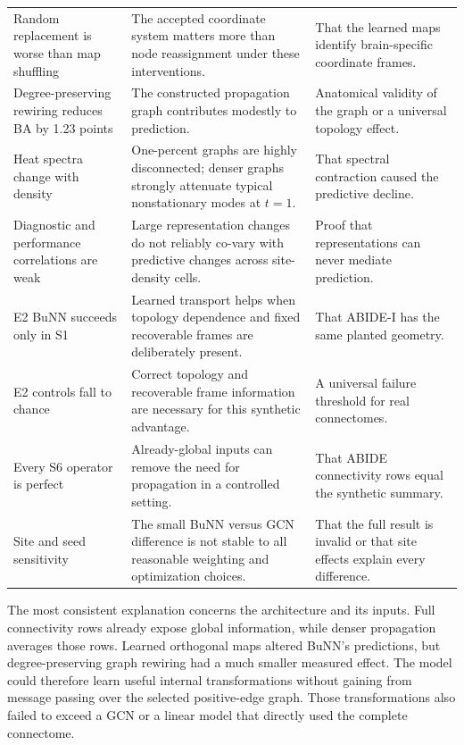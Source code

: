 \documentclass[11pt,a4paper]{article}
\begin{document}
\begin{table}[htbp]
\begin{tabularx}{\textwidth}{@{}p{3.1cm}Y Y@{}}
Random replacement is worse than map shuffling & The accepted coordinate system matters more than node reassignment under these interventions. & That the learned maps identify brain-specific coordinate frames. \\
Degree-preserving rewiring reduces BA by 1.23 points & The constructed propagation graph contributes modestly to prediction. & Anatomical validity of the graph or a universal topology effect. \\
Heat spectra change with density & One-percent graphs are highly disconnected; denser graphs strongly attenuate typical nonstationary modes at $t=1$. & That spectral contraction caused the predictive decline. \\
Diagnostic and performance correlations are weak & Large representation changes do not reliably co-vary with predictive changes across site-density cells. & Proof that representations can never mediate prediction. \\
E2 BuNN succeeds only in S1 & Learned transport helps when topology dependence and fixed recoverable frames are deliberately present. & That ABIDE-I has the same planted geometry. \\
E2 controls fall to chance & Correct topology and recoverable frame information are necessary for this synthetic advantage. & A universal failure threshold for real connectomes. \\
Every S6 operator is perfect & Already-global inputs can remove the need for propagation in a controlled setting. & That ABIDE connectivity rows equal the synthetic summary. \\
Site and seed sensitivity & The small BuNN versus GCN difference is not stable to all reasonable weighting and optimization choices. & That the full result is invalid or that site effects explain every difference. \\
\bottomrule
\end{tabularx}
\end{table}

The most consistent explanation concerns the architecture and its inputs. Full
connectivity rows already expose global information, while denser propagation
averages those rows. Learned orthogonal maps altered BuNN's predictions, but
degree-preserving graph rewiring had a much smaller measured effect. The model
could therefore learn useful internal transformations without gaining from
message passing over the selected positive-edge graph. Those transformations
also failed to exceed a GCN or a linear model that directly used the complete
connectome.
\end{document}
